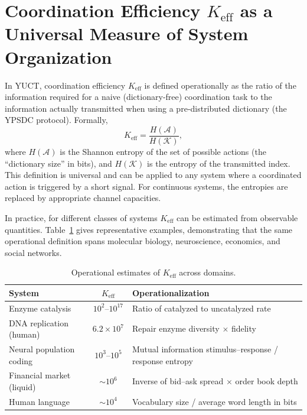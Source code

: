 \documentclass[11pt]{article}
\theoremstyle{remark}
\newcommand{\Keff}{K_{\mathrm{eff}}}
\begin{document}
	\section{Coordination Efficiency \texorpdfstring{\(\Keff\)}{Keff} as a Universal Measure of System Organization}
	\label{sec:keff}
	
	In YUCT, coordination efficiency \(\Keff\) is defined operationally as the ratio of the information required for a naive (dictionary‑free) coordination task to the information actually transmitted when using a pre‑distributed dictionary (the YPSDC protocol). Formally,
	\begin{equation}
		\Keff = \frac{H(\mathcal{A})}{H(\mathcal{K})},
	\end{equation}
	where \(H(\mathcal{A})\) is the Shannon entropy of the set of possible actions (the “dictionary size” in bits), and \(H(\mathcal{K})\) is the entropy of the transmitted index. This definition is universal and can be applied to any system where a coordinated action is triggered by a short signal. For continuous systems, the entropies are replaced by appropriate channel capacities. 
	
	In practice, for different classes of systems \(\Keff\) can be estimated from observable quantities. Table~\ref{tab:keff_examples} gives representative examples, demonstrating that the same operational definition spans molecular biology, neuroscience, economics, and social networks.
	
	\begin{table}[H]
		\centering
		\caption{Operational estimates of \(\Keff\) across domains.}
		\label{tab:keff_examples}
		\begin{tabular}{l c l}
			\toprule
			\textbf{System} & \(\Keff\) & \textbf{Operationalization} \\
			\midrule
			Enzyme catalysis & \(10^2\)–\(10^{17}\) & Ratio of catalyzed to uncatalyzed rate \\
			DNA replication (human) & \(6.2\times10^7\) & Repair enzyme diversity \(\times\) fidelity \\
			Neural population coding & \(10^3\)–\(10^5\) & Mutual information stimulus–response / response entropy \\
			Financial market (liquid) & \(\sim 10^6\) & Inverse of bid–ask spread \(\times\) order book depth \\
			Human language & \(\sim 10^4\) & Vocabulary size / average word length in bits \\
			\bottomrule
		\end{tabular}
	\end{table}
	
\end{document}
